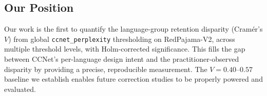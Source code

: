 \subsection{Our Position}

Our work is the first to quantify the language-group retention disparity (Cram{\'e}r's $V$) from global \texttt{ccnet\_perplexity} thresholding on RedPajama-V2, across multiple threshold levels, with Holm-corrected significance. This fills the gap between CCNet's per-language design intent \cite{Wenzek2019CCNet} and the practitioner-observed disparity \cite{Caswell2021Quality} by providing a precise, reproducible measurement. The $V = 0.40$--$0.57$ baseline we establish enables future correction studies to be properly powered and evaluated.
